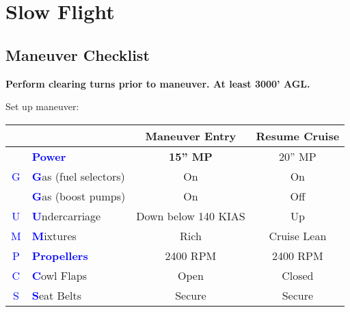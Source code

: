 
\newpage

\section{Slow Flight}
\subsection{Maneuver Checklist}

\textbf{Perform clearing turns prior to maneuver. At least 3000' AGL.}

Set up maneuver:

\begin{table}[H]
\centering
\begin{tabular}{|c|l|c|c|}
\hline
                    &                                                 & \textbf{Maneuver Entry} & \textbf{Resume Cruise} \\ \hline
                    & \textcolor{blue}{\textbf{Power}}                & \textbf{15'' MP}        & 20'' MP                \\ \hline
\textcolor{blue}{G} & \textcolor{blue}{\textbf{G}}as (fuel selectors) & On                      & On                     \\
                    & \textcolor{blue}{\textbf{G}}as (boost pumps)    & On                      & Off                    \\ \hline
\textcolor{blue}{U} & \textcolor{blue}{\textbf{U}}ndercarriage        & Down below 140 KIAS     & Up                     \\ \hline
\textcolor{blue}{M} & \textcolor{blue}{\textbf{M}}ixtures             & Rich                    & Cruise Lean            \\ \hline
\textcolor{blue}{P} & \textcolor{blue}{\textbf{Propellers}}           & 2400 RPM                & 2400 RPM               \\ \hline
\textcolor{blue}{C} & \textcolor{blue}{\textbf{C}}owl Flaps           & Open                    & Closed                 \\ \hline
\textcolor{blue}{S} & \textcolor{blue}{\textbf{S}}eat Belts           & Secure                  & Secure                 \\ \hline
\end{tabular}
\end{table}

